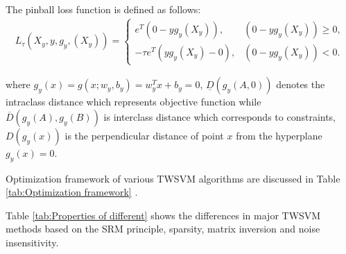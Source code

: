 \documentclass[pdflatex,sn-mathphys]{sn-jnl}%
\theoremstyle{thmstyleone}%
\theoremstyle{thmstyletwo}%
\theoremstyle{thmstylethree}%
\begin{document}
The pinball loss function is defined as follows:
\begin{align}
L_\tau\left(X_y,y,g_y,\left(X_y\right)\right)
= \left\{\begin{array}{cc}
e^T(0-yg_y(X_y)),& (0-yg_y(X_y))\ge 0, \\
-\tau e^T(yg_y(X_y)-0),& (0-yg_y(X_y))< 0.
\end{array}\right.
\end{align}

where $g_y(x)=g(x;w_y,b_y)=w_y^Tx+b_y=0$,  $\underline{D}(g_y(A,0))$ denotes the intraclass distance  which represents objective function while
$\overline{D}(g_y(A),g_y(B))$ is interclass distance which corresponds to constraints, $D(g_y(x))$ is the perpendicular distance of point $x$ from the hyperplane $g_y(x)=0$. 

Optimization framework of various TWSVM algorithms are discussed in Table \ref{tab:Optimization framework} \cite {li2019single}.


Table \ref{tab:Properties of different} shows the differences in major TWSVM methods based on the SRM principle, sparsity, matrix inversion and noise insensitivity.


\hspace*{-2.5cm}
\begin{table}%
\caption {Properties of different TWSVM Algorithms} \label{tab:Properties of different}
\end{table}
\end{document}
